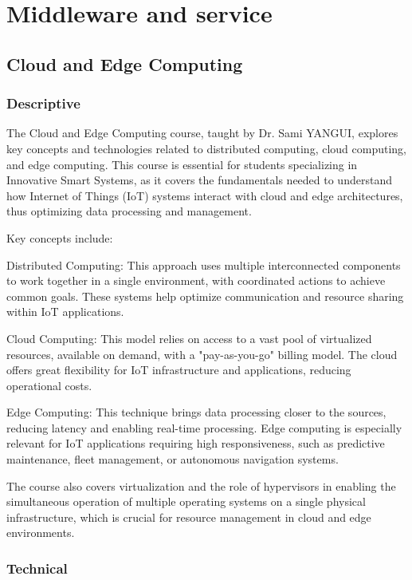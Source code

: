 \chapter{Middleware and service}

\section{Cloud and Edge Computing}
\subsection{Descriptive}


The Cloud and Edge Computing course, taught by Dr. Sami YANGUI, explores key concepts and technologies related to distributed computing, cloud computing, and edge computing. This course is essential for students specializing in Innovative Smart Systems, as it covers the fundamentals needed to understand how Internet of Things (IoT) systems interact with cloud and edge architectures, thus optimizing data processing and management.

Key concepts include:

Distributed Computing: This approach uses multiple interconnected components to work together in a single environment, with coordinated actions to achieve common goals. These systems help optimize communication and resource sharing within IoT applications.

Cloud Computing: This model relies on access to a vast pool of virtualized resources, available on demand, with a "pay-as-you-go" billing model. The cloud offers great flexibility for IoT infrastructure and applications, reducing operational costs.

Edge Computing: This technique brings data processing closer to the sources, reducing latency and enabling real-time processing. Edge computing is especially relevant for IoT applications requiring high responsiveness, such as predictive maintenance, fleet management, or autonomous navigation systems.

The course also covers virtualization and the role of hypervisors in enabling the simultaneous operation of multiple operating systems on a single physical infrastructure, which is crucial for resource management in cloud and edge environments.

\subsection{Technical}

